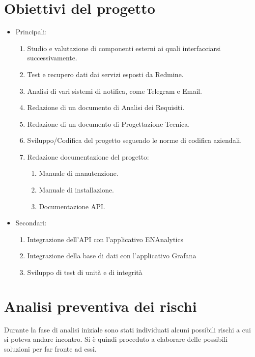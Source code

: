 \section{Obiettivi del progetto}
\begin{itemize}
	\item Principali:
	\begin{enumerate}
		\item Studio e valutazione di componenti esterni ai quali interfacciarsi successivamente.
		\item Test e recupero dati dai servizi esposti da Redmine.
		\item Analisi di vari sistemi di notifica, come Telegram e Email.
		\item Redazione di un documento di Analisi dei Requisiti.
		\item Redazione di un documento di Progettazione Tecnica.
		\item Sviluppo/Codifica del progetto seguendo le norme di codifica aziendali.
		\item Redazione documentazione del progetto:
		\begin{enumerate}
			\item Manuale di manutenzione.
			\item Manuale di installazione.
			\item Documentazione API.
		\end{enumerate}
	\end{enumerate}
	\item Secondari:
	\begin{enumerate}
		\item Integrazione dell'API con l'applicativo ENAnalytics
		\item Integrazione della base di dati con l'applicativo Grafana
		\item Sviluppo di test di unità e di integrità
	\end{enumerate}
\end{itemize}


\section{Analisi preventiva dei rischi}

Durante la fase di analisi iniziale sono stati individuati alcuni possibili rischi a cui si poteva andare incontro.
Si è quindi proceduto a elaborare delle possibili soluzioni per far fronte ad essi.\\


